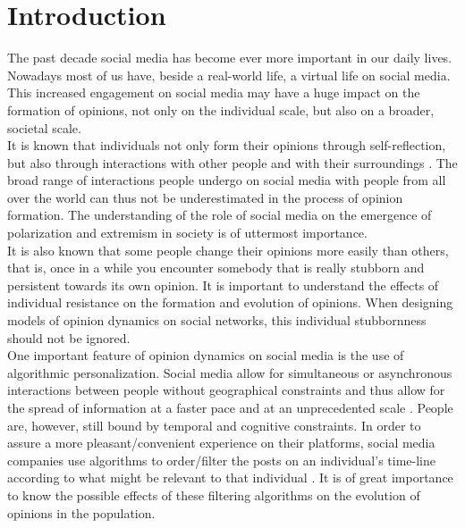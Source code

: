 \documentclass[11 pt , letterpaper , twoside , openright]{book}
\begin{document}
\chapter{Introduction}


The past decade social media has become ever more important in our daily lives. Nowadays most of us have, beside a real-world life, a virtual life on social media. This increased engagement on social media may have a huge impact on the formation of opinions, not only on the individual scale, but also on a broader, societal scale. \\
\newline
It is known that individuals not only form their opinions through self-reflection, but also through interactions with other people and with their surroundings \cite{Perra2019}. The broad range of interactions people undergo on social media with people from all over the world can thus not be underestimated in the process of opinion formation. The understanding of the role of social media on the emergence of polarization and extremism in society is of uttermost importance.\\
\newline
It is also known that some people change their opinions more easily than others, that is, once in a while you encounter somebody that is really stubborn and persistent towards its own opinion. It is important to understand the effects of individual resistance on the formation and evolution of opinions. When designing models of opinion dynamics on social networks, this individual stubbornness should not be ignored.\\
\newline
One important feature of opinion dynamics on social media is the use of algorithmic personalization. Social media allow for simultaneous or asynchronous interactions between people without geographical constraints and thus allow for the spread of information at a faster pace and at an unprecedented scale \cite{Perra2019}. People are, however, still bound by temporal and cognitive constraints. In order to assure a more pleasant/convenient experience on their platforms, social media companies use algorithms to order/filter the posts on an individual's time-line according to what might be relevant to that individual \cite{Perra2019}. It is of great importance to know the possible effects of these filtering algorithms on the evolution of opinions in the population.\\  
\end{document}
